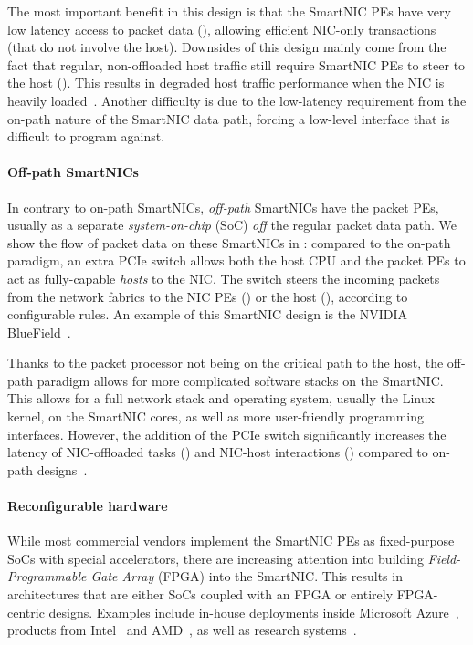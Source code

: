 The most important benefit in this design is that the SmartNIC PEs have very low latency access to packet data (), allowing efficient NIC-only transactions (that do not involve the host).  Downsides of this design mainly come from the fact that regular, non-offloaded host traffic still require SmartNIC PEs to steer to the host ().  This results in degraded host traffic performance when the NIC is heavily loaded~\cite{liu_offloading_2019}.  Another difficulty is due to the low-latency requirement from the on-path nature of the SmartNIC data path, forcing a low-level interface that is difficult to program against.

\paragraph{Off-path SmartNICs} In contrary to on-path SmartNICs, \emph{off-path} SmartNICs have the packet PEs, usually as a separate \emph{system-on-chip} (SoC) \emph{off} the regular packet data path.  We show the flow of packet data on these SmartNICs in : compared to the on-path paradigm, an extra PCIe switch allows both the host CPU and the packet PEs to act as fully-capable \emph{hosts} to the NIC.  The switch steers the incoming packets from the network fabrics to the NIC PEs () or the host (), according to configurable rules.  An example of this SmartNIC design is the NVIDIA BlueField~\cite{nvidia_corporation_nvidia_2021}.

Thanks to the packet processor not being on the critical path to the host, the off-path paradigm allows for more complicated software stacks on the SmartNIC.  This allows for a full network stack and operating system, usually the Linux kernel, on the SmartNIC cores, as well as more user-friendly programming interfaces.  However, the addition of the PCIe switch significantly increases the latency of NIC-offloaded tasks () and NIC-host interactions () compared to on-path designs~\cite{wei_characterizing_2023}.

\paragraph{Reconfigurable hardware} While most commercial vendors implement the SmartNIC PEs as fixed-purpose SoCs with special accelerators, there are increasing attention into building \emph{Field-Programmable Gate Array} (FPGA) into the SmartNIC.  This results in architectures that are either SoCs coupled with an FPGA or entirely FPGA-centric designs.  Examples include in-house deployments inside Microsoft Azure~\cite{firestone_azure_2018}, products from Intel~\cite{intel_intel_nodate} and AMD~\cite{xilinx_alveo_2020, xilinx_alveo_2022}, as well as research systems~\cite{wang_fpganic_2022, khazraee_rosebud_2023}.

